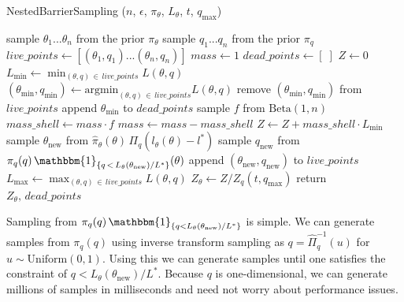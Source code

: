 \documentclass[12pt, a4paper]{report}
\begin{document}
\begin{algorithm}
    \caption[Nested Sampling with the log barrier term.]{NestedBarrierSampling ($n$, $\epsilon$, $\pi_\theta$, $L_\theta$, $t$, $q_{\textrm{max}}$)}
    \label{alg:barriersampling}
    \begin{algorithmic}
        \State sample $\theta_1 ... \theta_n$ from the prior $\pi_\theta$
        \State sample $q_1 ... q_n$ from the prior $\pi_q$
        \State $live\_points \gets [ (\theta_1, q_1) ... (\theta_n, q_n) ]$
        \State $mass \gets 1$
        \State $dead\_points \gets [ \; ]$
        \State $Z \gets 0$
        \Repeat
            \State $L_{\textrm{min}} \gets \min_{(\theta,q) \, \in \, live\_points} L(\theta, q)$ 
            \State $(\theta_{\textrm{min}}, q_{\textrm{min}}) \gets \textrm{argmin}_{(\theta,q) \, \in \, live\_points} L(\theta, q)$ 
            \State remove $(\theta_{\textrm{min}}, q_{\textrm{min}})$ from $live\_points$
            \State append $\theta_{\textrm{min}}$ to $dead\_points$
            \State sample $f$ from  $\textrm{Beta}(1, n)$
            \State $mass\_shell \gets mass \cdot f$
            \State $mass \gets mass - mass\_shell$
            \State $Z \gets Z + mass\_shell \cdot L_{\textrm{min}}$
            \State sample $\theta_{\textrm{new}}$ from $\hat{\pi}_\theta(\theta) \, \Pi_q(l_\theta(\theta) - l^*)$
            \State sample $q_{\textrm{new}}$ from $\pi_q(q) \, \mathbbm{1}_{\{q \,<\, L_\theta(\theta_{\textrm{new}}) / L^*\}}(\theta)$
            \State append $(\theta_{\textrm{new}}, q_{\textrm{new}})$ to $live\_points$
            \State $L_{\textrm{max}} \gets \max_{(\theta,q) \, \in \, live\_points} L(\theta, q)$ 
        \State $Z_\theta \gets Z / Z_q(t, q_{\textrm{max}})$
        \State return $Z_\theta,\, dead\_points$
    \end{algorithmic}
\end{algorithm}

Sampling from $\pi_q(q) \, \mathbbm{1}_{\{q < L_\theta(\theta_{\textrm{new}}) / L^*\}}$ is simple.
We can generate samples from $\pi_q(q)$ using inverse transform sampling \cite[23]{bayesian_data_analysis} as $q = \hat{\Pi}^{-1}_q(u)$ for $u \sim \textrm{Uniform}(0,1)$.
Using this we can generate samples until one satisfies the constraint of $q < L_\theta(\theta_{\textrm{new}}) / L^*$.
Because $q$ is one-dimensional, we can generate millions of samples in milliseconds and need not worry about performance issues.
\end{document}
